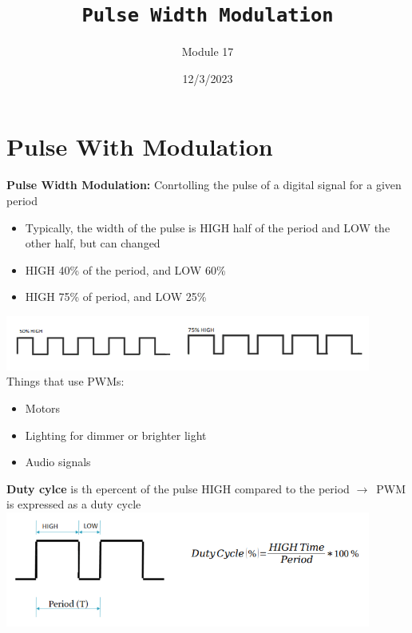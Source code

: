 \documentclass[a4paper,12pt]{article}
\title{\texttt{Pulse Width Modulation}\\\hrulefill}
\author{Module 17}
\date{\small{12/3/2023}}
\newcommand{\ra}{$\rightarrow$}
\begin{document}
    \maketitle

    \section{Pulse With Modulation}
        \textbf{Pulse Width Modulation:} Conrtolling the pulse of a digital signal for a given period
        \begin{itemize}
            \item Typically, the width of the pulse is HIGH half of the period and LOW the other half, but can changed
            \item HIGH 40\% of the period, and LOW 60\%
            \item HIGH 75\% of period, and LOW 25\%
        \end{itemize}
        \includegraphics[width=12cm]{PWM1.png}
        \\Things that use PWMs:
        \begin{itemize}
            \item Motors
            \item Lighting for dimmer or brighter light
            \item Audio signals
        \end{itemize}
        \textbf{Duty cylce} is th epercent of the pulse HIGH compared to the period \ra~PWM is expressed as a duty cycle\\
        \includegraphics[width=12cm]{dutyCycle.png}
        
\end{document}
